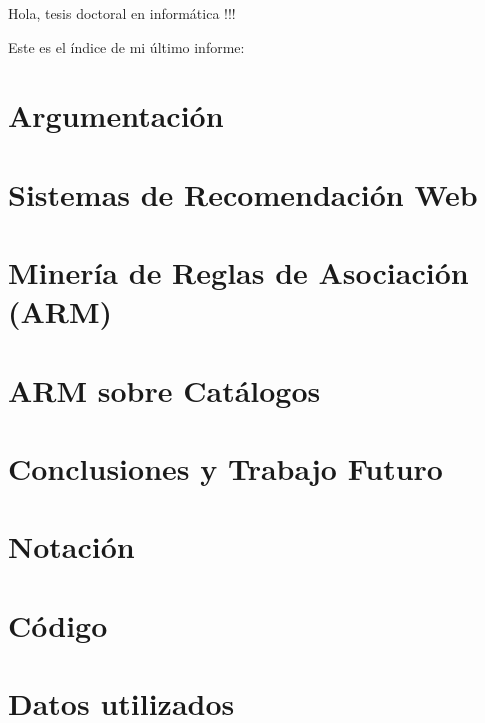 \documentclass[utf8]{book}
\begin{document}



Hola, tesis doctoral en informática !!!
\newpage

%


Este es el índice de mi último informe: 

\tableofcontents

\chapter*{Argumentación}
\label{chap:argumentacion}





\chapter[SRW]{Sistemas de Recomendación Web}
\label{chap:SRW}





\chapter[ARM]{Minería de Reglas de Asociación (ARM)}
\label{chap:arm}





\chapter{ARM sobre Catálogos}
\label{chap:catalogos}





\chapter{Conclusiones y Trabajo Futuro}
\label{chap:conclusiones-y-trabajo-futuro}




\appendix
\chapter{Notación}
\label{apdx:notacion}


\chapter{Código}
\label{apdx:codigo}


\chapter{Datos utilizados}
\label{apdx:datos-utilizados}


\listoffigures

\listoftables
\end{document}
